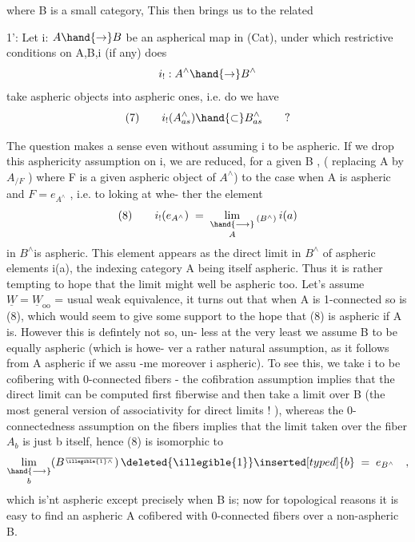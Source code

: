 
where B is a small category,  This then brings us to the related

\hand{\uline{\textcolor{black}{Question}}} 1': Let i: $A\hand{\to} B$ be an aspherical map in (Cat), under which
restrictive conditions on A,B,i (if any) does 
\[ i_! : A^\wedge\hand{\to} B^\wedge \]
take aspheric objects into aspheric ones, i.e. do we have
\[ (7) \qquad i_!(A^\wedge_{as}) \hand{\subset} B^\wedge_{as} \qquad ? \]

The question makes a sense even without assuming i to be aspheric.
If we drop this asphericity assumption on i, we are reduced, for a given
B , ( replacing A by $A_{/F}$ ) where F is a given  aspheric object of
$A^\wedge$) to the case when A is aspheric and $F=e_{A^\wedge}$ , i.e. to loking at whe-%
ther the element
\[ (8) \qquad i_!(e_{A^\wedge}) \;=\; \mathop{\underset{\hand{\longrightarrow}}{\mathrm{lim}}}\limits_{A}{}_{(B^\wedge)}\, i(a) \]
in $B^\wedge$\hand{/}is aspheric. This element appears as the direct limit in $B^\wedge$ of
aspheric elements i(a), the indexing category A being itself aspheric.
Thus it is rather tempting to hope that the limit might well be aspheric
too. Let's assume $\underline{W}=\underline{W}_{\mathrm{oo}}$ = usual weak equivalence, it turns out that when
A is 1-connected so is (8), which would seem to give some support to the
hope that (8) is aspheric if A is. However this is defintely not so, un-%
less at the very least we assume B to be equally aspheric (which is howe-%
ver a rather natural assumption, as it follows from A aspheric if we assu%
-me moreover i  aspheric). To see this, we take i to be cofibering with
0-connected fibers - the cofibration assumption implies that the direct
limit  can be computed first fiberwise and then take a limit over B
(the most general version of associativity for direct limits ! ), whereas
the 0-connectedness assumption on the fibers implies that the limit taken
over the fiber $A_b$ is just b itself, hence (8) is isomorphic to
\[ \mathop{\underset{\hand{\longrightarrow}}{\mathrm{lim}}}\limits_{b}(B^{\over{\illegible{1}}{\wedge}})\,\deleted{\illegible{1}}\inserted[typed]{b} \;=\; e_{B^\wedge} \quad , \]
which is'nt aspheric except precisely when B is; now for topological
reasons it is easy to find an aspheric A cofibered with 0-connected fibers
over a non-aspheric B.

